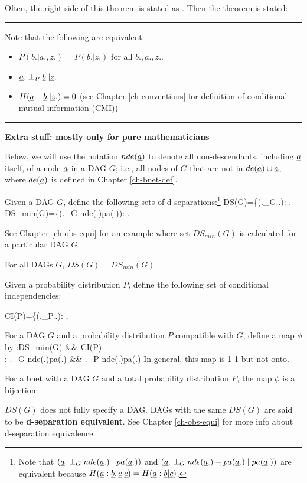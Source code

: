 Often, the right side
of this theorem is stated as 
.
Then the theorem is stated:

\hrule
Note that 
the following are equivalent:
\begin{itemize}
\item
$P(b.|a., z.)=P(b.|z.)$ for all $b., a., z.$.
\item
$\rva.\perp_P \rvb.|\rvz.$
\item
$H(\rva.:\rvb.|\rvz.)=0$
(see Chapter \ref{ch-conventions}
for definition of
 conditional mutual information (CMI))
\end{itemize}
\hrule\noindent
{\bf Extra stuff: mostly only for 
 pure mathematicians}

Below, we will use
the notation $nde(\rva)$
to denote
all non-descendants,
including $\rva$ itself, 
of a node $\rva$
in a DAG $G$; i.e.,
all nodes of $G$ that are not
in $de(\rva)\cup \rva$, where
$de(\rva)$
is defined in Chapter \ref{ch-bnet-def}.

Given a DAG $G$, define 
the following
sets of d-separations:\footnote{
Note that
$(\rva.\perp_G
nde(\rva.)\mid pa(\rva.))$ and
$(\rva.\perp_G
nde(\rva.)-pa(\rva.)\mid pa(\rva.))$
are
equivalent
because
$H(\rva:\rvb, \rvc|\rvc)=
H(\rva:\rvb|\rvc)$.
}
\beq
DS(G)=\{(\rva.\perp_G\rvb.\mid\rvz.):
\;.
\eeq
\beq
DS_{min}(G)=\{(\rva.\perp_G
nde(\rva.)\mid pa(\rva.)):
\;.
\eeq

See Chapter \ref{ch-obs-equi}
for an example
where set $DS_{min}(G)$
is calculated for 
a particular DAG $G$.

\begin{claim}
For all DAGs $G$, $DS(G)=DS_{min}(G)$.
\end{claim}

Given a probability distribution  $P$, 
define the following
set of conditional independencies:

\beq
CI(P)=\{(\rva.\perp_P\rvb.\mid \rvz.):
\;,
\eeq


For a DAG $G$
and a probability
distribution $P$
compatible with $G$,
define  a map $\phi$
by
\beqa
\phi:DS_{min}(G) &\rarrow& CI(P)
\\
\phi: \rva.\perp_G nde(\rva.)\mid pa(\rva.)
&\mapsto&
\rva.\perp_P nde(\rva.)\mid pa(\rva.)
\eeqa
In general, this map
is 1-1 but not onto.


\begin{claim}
For a bnet 
with a DAG $G$
and a total probability distribution $P$,
the map $\phi$ is a bijection.
\end{claim}

$DS(G)$
does not fully specify a DAG.
DAGs with the same 
$DS(G)$ are said to be
{\bf d-separation equivalent}.
See Chapter \ref{ch-obs-equi}
for more info about 
d-separation equivalence.